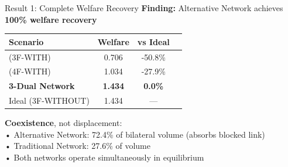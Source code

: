 \documentclass[aspectratio=169]{beamer}
\begin{document}
\begin{frame}{Result 1: Complete Welfare Recovery}
    \textbf{Finding:} Alternative Network achieves \textbf{100\% welfare recovery}
    
    \vspace{0.3cm}
    \begin{table}
        \centering
        \begin{tabular}{lccc}
            \toprule
            \textbf{Scenario} & \textbf{Welfare} & \textbf{vs Ideal} \\
            \midrule
            (3F-WITH) & 0.706 & -50.8\%  \\
            (4F-WITH) & 1.034 & -27.9\%  \\
            \midrule
            \textbf{3-Dual Network} & \textbf{1.434} & \textbf{0.0\%}  \\
            \midrule
            Ideal (3F-WITHOUT) & 1.434 & ---  \\
            \bottomrule
        \end{tabular}
    \end{table}
    
    \textbf{Coexistence}, not displacement: \\
    • Alternative Network: 72.4\% of bilateral volume (absorbs blocked link) \\
    • Traditional Network: 27.6\% of volume \\
    • Both networks operate simultaneously in equilibrium
\end{frame}
\end{document}
